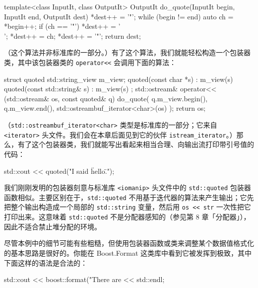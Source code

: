 \begin{codebox}[cpp]
    template<class InputIt, class OutputIt>
    OutputIt do_quote(InputIt begin, InputIt end,
      OutputIt dest)
    {
      *dest++ = '"';
      while (begin != end) {
        auto ch = *begin++;
        if (ch == '"') {
            *dest++ = '\\';
        }
        *dest++ = ch;
      }
      *dest++ = '"';
      return dest;
    }
\end{codebox}

（这个算法并非标准库的一部分。）有了这个算法，我们就能轻松构造一个包装器类，其中该包装器类的 \texttt{operator<<} 会调用下面的算法：

\begin{codebox}[cpp]
    struct quoted {
      std::string_view m_view;
      quoted(const char *s) : m_view(s) {}
      quoted(const std::string& s) : m_view(s) {}
    };
    std::ostream& operator<< (std::ostream& os, const quoted& q)
    {
      do_quote(
        q.m_view.begin(),
        q.m_view.end(),
        std::ostreambuf_iterator<char>(os)
      );
      return os;
    }
\end{codebox}

（\texttt{std::\allowbreak{}ostreambuf\_\allowbreak{}iterator<\allowbreak{}char>\allowbreak{}} 类型是标准库的一部分；它来自 \texttt{<iterator>\allowbreak{}} 头文件。我们会在本章后面见到它的伙伴 \texttt{istream\_\allowbreak{}iterator}。）那么，有了这个包装器类，我们就能写出看起来相当合理、向输出流打印带引号值的代码：

\begin{codebox}[cpp]
    std::cout << quoted("I said \"hello\".");
\end{codebox}

我们刚刚发明的包装器刻意与标准库 \texttt{<iomanip>\allowbreak{}} 头文件中的 \texttt{std::\allowbreak{}quoted} 包装器函数相似。主要区别在于，\texttt{std::\allowbreak{}quoted} 不用基于迭代器的算法来产生输出；它先把整个输出构造成一个局部的 \texttt{std::\allowbreak{}string} 变量，然后用 \texttt{os << str} 一次性把它打印出来。这意味着 \texttt{std::\allowbreak{}quoted} 不是分配器感知的（参见第 8 章「分配器」），因此不适合禁止堆分配的环境。

尽管本例中的细节可能有些粗糙，但使用包装器函数或类来调整某个数据值格式化的基本思路是很好的。你能在 Boost.Format 这类库中看到它被发挥到极致，其中下面这样的语法是合法的：

\begin{codebox}[cpp]
    std::cout << boost::format("There are %
              << std::endl;
\end{codebox}

